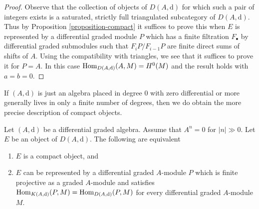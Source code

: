 \begin{proof}
Observe that the collection of objects of $D(A, \text{d})$ for which
such a pair of integers exists is a saturated, strictly full triangulated
subcategory of $D(A, \text{d})$.
Thus by Proposition \ref{proposition-compact} it suffices to prove
this when $E$ is represented by a differential graded module $P$ which
has a finite filtration $F_\bullet$ by differential graded submodules
such that $F_iP/F_{i - 1}P$ are finite direct sums of shifts of $A$.
Using the compatibility with triangles, we see that it suffices
to prove it for $P = A$. In this case $\mathop{\mathrm{Hom}}\nolimits_{D(A, \text{d})}(A, M) = H^0(M)$
and the result holds with $a = b = 0$.
\end{proof}

\noindent
If $(A, \text{d})$ is just an algebra placed in degree $0$
with zero differential or more generally lives in
only a finite number of degrees, then we do obtain the
more precise description of compact objects.

\begin{lemma}
\label{lemma-compact}
Let $(A, \text{d})$ be a differential graded algebra. Assume that $A^n = 0$
for $|n| \gg 0$. Let $E$ be an object of $D(A, \text{d})$.
The following are equivalent
\begin{enumerate}
\item $E$ is a compact object, and
\item $E$ can be represented by a differential graded $A$-module $P$
which is finite projective as a graded $A$-module and satisfies
$\mathop{\mathrm{Hom}}\nolimits_{K(A, \text{d})}(P, M) = \mathop{\mathrm{Hom}}\nolimits_{D(A, \text{d})}(P, M)$
for every differential graded $A$-module $M$.
\end{enumerate}
\end{lemma}


